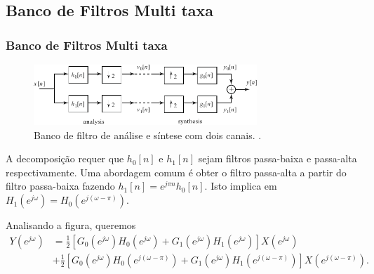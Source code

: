 \subsection{Banco de Filtros Multi taxa}
\begin{frame}[allowframebreaks]
  \frametitle{Banco de Filtros Multi taxa}

        \begin{figure}[h!]
        \centering
        \includegraphics[width=0.75\textwidth]{images/fig444.pdf}
        \caption{Banco de filtro de análise e síntese com dois canais. \citep{oppenheim2009}.}
        \label{fig:fig444}
        \end{figure}


  A decomposição requer que $h_0[n]$ e $h_1[n]$ sejam filtros passa-baixa e passa-alta 
  respectivamente. Uma abordagem comum é obter o filtro passa-alta a partir do filtro
  passa-baixa fazendo $h_1[n] = e^{j\pi n} h_0[n]$. Isto implica em $H_1(e^{j\omega}) = H_0(e^{j(\omega - \pi)})$.

  Analisando a figura, queremos
  \begin{align}\label{eq-yejw-fb}
  Y(e^{j\omega}) &= \frac{1}{2} \left[ G_0(e^{j\omega}) H_0(e^{j\omega}) + G_1(e^{j\omega}) H_1(e^{j\omega}) \right] X(e^{j\omega}) \\
                & + \frac{1}{2} \left[ G_0(e^{j\omega}) H_0(e^{j(\omega-\pi)}) + G_1(e^{j\omega}) H_1(e^{j(\omega-\pi)}) \right] X(e^{j(\omega - \pi)}) .
  \end{align}


\end{frame}
